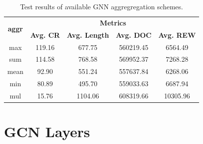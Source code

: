 \begin{table}[H]
	\centering
	\caption{Test results of available \ac{GNN} aggregregation schemes.}
	\begin{tabular}{ccccc}
		\toprule
		\multirow{2}{*}{\textbf{aggr}} & \multicolumn{4}{c}{\textbf{Metrics}} \\ 
		\cmidrule(lr){2-5}
		&  \textbf{Avg. CR} & \textbf{Avg. Length} & \textbf{Avg. DOC} & \textbf{Avg. REW} \\ 
		\midrule
		max & 119.16 & 677.75 & 560219.45 & 6564.49 \\
		sum & 114.58 & 768.58 & 569952.37 & 7268.28 \\
		mean & 92.90 &  551.24 & 557637.84 & 6268.06 \\
		min & 80.89 & 495.70 & 559033.63 & 6687.94 \\
		mul & 15.76 & 1104.06 & 608319.66 & 10305.96 \\
		\bottomrule
	\end{tabular}
	\label{tab:test-gcn-aggr2}
\end{table}

\section{\ac{GCN} Layers}


